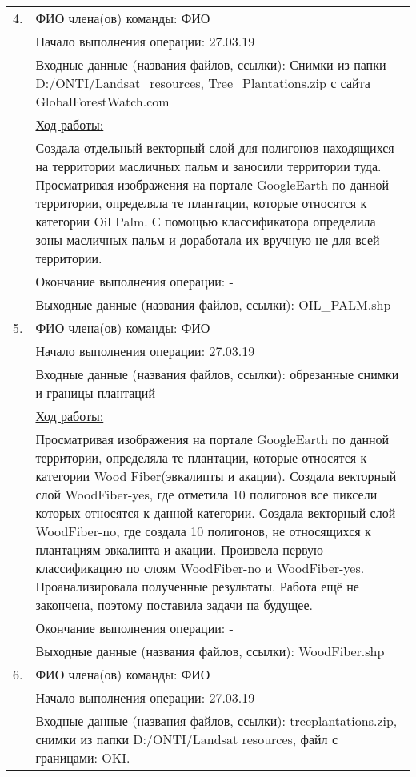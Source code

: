\begin{center}
\begin{longtable}{|l|p{14.5cm}|}
        \hline
        4. & ФИО члена(ов) команды: ФИО \\
           & Начало выполнения операции: 27.03.19 \\
           & Входные данные (названия файлов, ссылки): Снимки из папки D:/ONTI/Landsat\_resources, Tree\_Plantations.zip с сайта GlobalForestWatch.com \\
           & \underline{Ход работы:} \\
           & Создала отдельный векторный слой для полигонов находящихся на территории масличных пальм и заносили территории туда. Просматривая изображения на портале GoogleEarth по данной территории, определяла те плантации, которые относятся к категории Oil Palm. С помощью классификатора определила зоны масличных пальм и доработала их вручную не для всей территории. \\
           & Окончание выполнения операции: - \\
           & Выходные данные (названия файлов, ссылки): OIL\_PALM.shp \\
        \hline
        5. & ФИО члена(ов) команды: ФИО \\
           & Начало выполнения операции: 27.03.19 \\
           & Входные данные (названия файлов, ссылки): обрезанные снимки и границы плантаций \\
           & \underline{Ход работы:} \\
           & Просматривая изображения на портале GoogleEarth по данной территории, определяла те плантации, которые относятся к категории Wood Fiber(эвкалипты и акации). Создала векторный слой WoodFiber-yes, где отметила 10 полигонов все пиксели которых относятся к данной категории. Создала векторный слой WoodFiber-no, где создала 10 полигонов, не относящихся к плантациям эвкалипта и акации. Произвела первую классификацию по слоям WoodFiber-no и WoodFiber-yes. Проанализировала полученные результаты. Работа ещё не закончена, поэтому поставила задачи на будущее.\\
           & Окончание выполнения операции: - \\
           & Выходные данные (названия файлов, ссылки): WoodFiber.shp \\
        \hline
        6. & ФИО члена(ов) команды: ФИО \\
           & Начало выполнения операции: 27.03.19 \\
           & Входные данные (названия файлов, ссылки): treeplantations.zip, снимки из папки D:/ONTI/Landsat resources, файл с границами: OKI. \\

\end{longtable}
\end{center}
